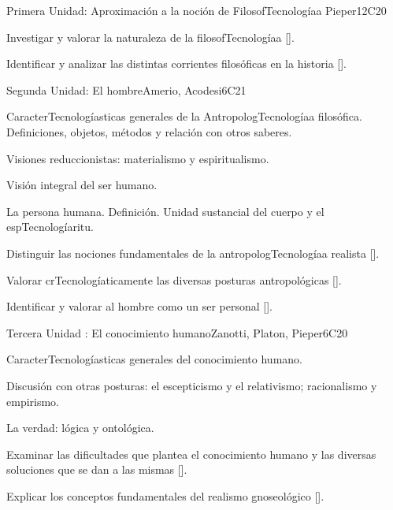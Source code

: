 \begin{syllabus}
\begin{unit}{}{Primera Unidad: Aproximación a la noción de FilosofTecnologíaa }{Pieper}{12}{C20}
\begin{learningoutcomes}
	\item Investigar y valorar la naturaleza de la filosofTecnologíaa [\Usage].
	\item Identificar y analizar las distintas corrientes filosóficas en la historia [\Usage].
\end{learningoutcomes}
\end{unit}

\begin{unit}{}{Segunda Unidad: El hombre}{Amerio, Acodesi}{6}{C21}
\begin{topics}
	\item CaracterTecnologíasticas generales de la AntropologTecnologíaa filosófica. Definiciones, objetos, métodos y relación con otros saberes.
	\item Visiones reduccionistas: materialismo y espiritualismo.
	\item Visión integral del ser humano.
    \item La persona humana. Definición. Unidad sustancial del cuerpo y el espTecnologíaritu.
\end{topics}

\begin{learningoutcomes}
	\item Distinguir las nociones fundamentales de la antropologTecnologíaa realista [\Usage].
	\item Valorar crTecnologíaticamente las diversas posturas antropológicas [\Usage].
	\item Identificar y valorar al hombre como un ser personal [\Usage].
\end{learningoutcomes}
\end{unit}

\begin{unit}{}{Tercera Unidad : El conocimiento humano}{Zanotti, Platon, Pieper}{6}{C20}
\begin{topics}
	\item CaracterTecnologíasticas generales del conocimiento humano.
    \item Discusión con otras posturas: el escepticismo y el relativismo; racionalismo y empirismo.
    \item La verdad: lógica y ontológica.
\end{topics}
\begin{learningoutcomes}
	\item Examinar las dificultades que plantea el conocimiento humano y las diversas soluciones que se dan a las mismas [\Usage].
    \item Explicar los conceptos fundamentales del realismo gnoseológico [\Usage].
\end{learningoutcomes}
\end{unit}


\end{syllabus}
